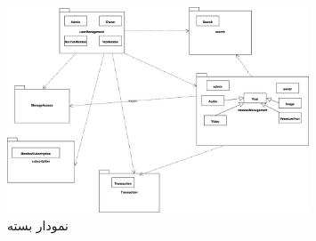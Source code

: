 \begin{figure}[H]
    \centering
    \includegraphics[width = 0.8\textwidth]{files/figures/PackageDigarams/packageDiagram.jpg}
    \caption{نمودار بسته}
    \label{fig:packageDiagram}
\end{figure}